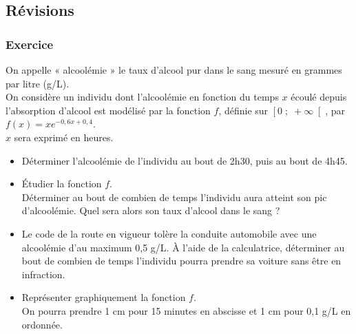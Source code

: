 \vspace*{-5cm}

\newpage

\subsection{Révisions}

\subsubsection{Exercice }

On appelle « alcoolémie » le taux d'alcool pur dans le sang mesuré en grammes par litre (g/L). \\
On considère un individu dont l'alcoolémie en fonction du temps $x$ écoulé depuis l'absorption d'alcool est modélisé par la fonction $f$, définie sur $\left[0 \;  ;\; +\infty\right[$, par $f(x) = xe^{-0,6x+0,4}$. \\
$x$ sera exprimé en heures. \\

\begin{itemize}
\item[1.] Déterminer l'alcoolémie de l'individu au bout de 2h30, puis au bout de 4h45. \\
\item[2.] Étudier la fonction $f$. \\ Déterminer au bout de combien de temps l'individu aura atteint son pic d'alcoolémie. Quel sera alors son taux d'alcool dans le sang ? \\
\item[3.] Le code de la route en vigueur tolère la conduite automobile avec une alcoolémie d'au maximum 0,5 g/L. À l'aide de la calculatrice, déterminer au bout de combien de temps l'individu pourra prendre sa voiture sans être en infraction. \\
\item[4.] Représenter graphiquement la fonction $f$. \\ On pourra prendre 1 cm pour 15 minutes en abscisse et 1 cm pour 0,1 g/L en ordonnée. \\
\end{itemize}

\vspace*{.3cm}

